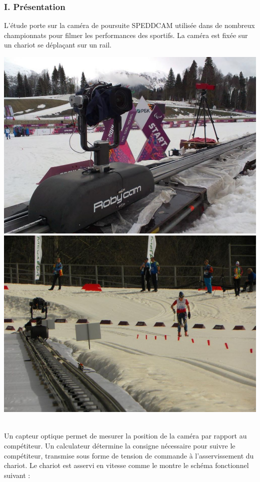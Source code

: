 \subsubsection{I. Pr\'esentation}
L'\'etude porte sur la cam\'era de poursuite SPEDDCAM utilis\'ee dans de nombreux championnats pour filmer les performances des sportifs. La cam\'era est fix\'ee sur un chariot se d\'epla\c{c}ant sur un rail.
\\ \hspace*{0mm}
\begin{center}\includegraphics[scale=0.22]{png/img1_prob2.jpg} \includegraphics[scale=0.22]{png/img2_prob2.jpg}\end{center}
\hspace*{0mm}
\\Un capteur optique permet de mesurer la position de la cam\'era par rapport au comp\'etiteur. Un calculateur d\'etermine la consigne n\'ecessaire pour suivre le comp\'etiteur, transmise sous forme de tension de commande \`a l'asservissement du chariot. Le chariot est asservi en vitesse comme le montre le sch\'ema fonctionnel suivant :
